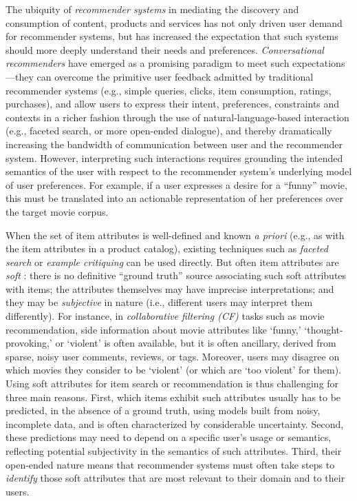 \documentclass[manuscript,screen,nonacm]{acmart}
\newcommand{\1}{{\mathbf 1}}
\theoremstyle{TheoremNum}
\begin{document}
The ubiquity of \emph{recommender systems} in mediating the discovery and consumption of content, products and services has not only driven user demand for recommender systems, but has increased the expectation that such systems should more deeply understand their needs and preferences.
\emph{Conversational recommenders} \cite{wicrs2020} have emerged as a promising paradigm to meet such expectations---they can overcome the primitive user feedback admitted by traditional recommender systems (e.g., simple queries, clicks, item consumption, ratings, purchases), and allow users to express their intent, preferences, constraints and contexts in a richer fashion through the use of natural-language-based interaction (e.g., faceted search, or more open-ended dialogue), and thereby dramatically increasing the bandwidth of communication between user and the recommender system.
However, interpreting such interactions requires grounding the intended semantics of the user with respect to the recommender system's underlying model of user preferences. For example,
if a user expresses a desire for a ``funny'' movie, this must be translated into an actionable representation of her preferences over the target movie corpus.

 When the set of item attributes is well-defined and known \emph{a priori} (e.g., as with the item attributes in a product catalog), existing techniques such as \emph{faceted search} \cite{koren_facted:www08,zheng_faceted_survey:2013} or \emph{example critiquing} \cite{burke-critiquing,chen_critiquing_survey:umuai2012} can be used directly. But often item attributes are \emph{soft} \cite{sigir21:filipandkristian}: there is no definitive ``ground truth'' source associating such soft attributes with items; the attributes themselves may have imprecise interpretations; and they may be \emph{subjective} in nature (i.e., different users may interpret them differently). For instance, in \emph{collaborative filtering (CF)} tasks such as movie recommendation, side information about movie attributes like `funny,' `thought-provoking,' or `violent' is often available, but it is often
 ancillary, derived from sparse, noisy user comments, reviews, or tags. Moreover, users may disagree on which movies they consider to be `violent' (or which are `too violent' for them). Using soft attributes for item search or recommendation is thus challenging for three main reasons. First, which items exhibit such attributes usually has to be predicted, in the absence of a ground truth, using models built from noisy, incomplete data, and is often characterized by considerable uncertainty. Second, these predictions may need to depend on a specific user's usage or semantics, reflecting potential subjectivity in the semantics of such attributes. Third, their open-ended nature means that recommender systems must often take steps to \emph{identify} those soft attributes that are most relevant to their domain and to their users.
 
\end{document}
